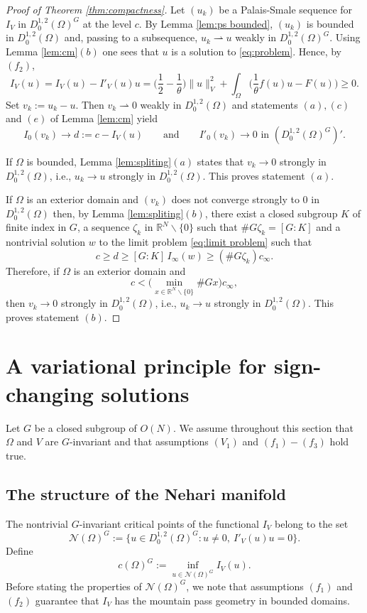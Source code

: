 \documentclass[10pt,letterpaper]{article}
\numberwithin{equation}{section}
\def\rn{\mathbb{R}^N}
\def\rh{\rightharpoonup}
\def\io{\int_{\Omega}}
\def\o{\Omega}
\def\cN{\mathcal{N}}
\begin{document}
\medskip

\begin{proof}[Proof of Theorem \ref{thm:compactness}]
Let $(u_k)$ be a Palais-Smale sequence for $I_V$ in $D^{1,2}_0(\o)^G$ at the level $c$. By Lemma \ref{lem:ps bounded}, $(u_k)$ is bounded in $D^{1,2}_0(\o)$ and, passing to a subsequence, $u_k\rh u$ weakly in $D^{1,2}_0(\o)^G$. Using Lemma \ref{lem:cm}$(b)$ one sees that $u$ is a solution to \eqref{eq:problem}. Hence, by $(f_2)$,
$$I_V(u)=I_V(u)-I'_V(u)u=\Big(\frac{1}{2}-\frac{1}{\theta}\Big)\|u\|^2_V+\io\Big(\frac{1}{\theta}f(u)u-F(u)\Big)\geq 0.$$
Set $v_k:=u_k-u$. Then $v_k\rh 0$ weakly in $D^{1,2}_0(\o)$ and statements $(a),(c)$ and $(e)$ of Lemma \ref{lem:cm} yield
$$I_0(v_k)\to d:=c-I_V(u)\qquad\text{and}\qquad I'_0(v_k)\to 0\text{ \ in \ }(D^{1,2}_0(\o)^G)'.$$

If $\o$ is bounded, Lemma \ref{lem:spliting}$(a)$ states that $v_k\to 0$ strongly in $D^{1,2}_0(\o)$, i.e., $u_k\to u$ strongly in $D^{1,2}_0(\o)$. This proves statement $(a)$.

If $\o$ is an exterior domain and $(v_k)$ does not converge strongly to $0$ in $D^{1,2}_0(\o)$ then, by Lemma \ref{lem:spliting}$(b)$, there exist a closed subgroup $K$ of finite index in $G$, a sequence $\zeta_k$ in $\rn\smallsetminus\{0\}$ such that $\#G\zeta_k=[G:K]$ and a nontrivial solution $w$ to the limit problem \eqref{eq:limit problem} such that
$$c\geq d\geq[G:K]\,I_{\infty}(w)\geq(\#G\zeta_k)c_\infty.$$
Therefore, if $\o$ is an exterior domain and
$$c<\big(\min_{x\in\rn\smallsetminus\{0\}}\#Gx\big)c_\infty,$$
then $v_k\to 0$ strongly in $D^{1,2}_0(\o)$, i.e., $u_k\to u$ strongly in $D^{1,2}_0(\o)$. This proves statement $(b)$.
\end{proof}


\section{A variational principle for sign-changing solutions}

Let $G$ be a closed subgroup of $O(N)$. We assume throughout this section that $\o$ and $V$ are $G$-invariant and that assumptions $(V_1)$ and $(f_1)-(f_3)$ hold true.

\subsection{The structure of the Nehari manifold}

The nontrivial $G$-invariant critical points of the functional $I_V$ belong to the set
$$\cN(\o)^G:= \{u\in D^{1,2}_0(\o)^G : u\neq 0, \ I'_V(u)u=0\}.$$
Define
$$c(\o)^G:= \inf_{u\in\cN(\o)^G} I_V(u).$$ 
Before stating the properties of $\cN(\o)^G$, we note that assumptions $(f_1)$ and $(f_2)$ guarantee that $I_V$ has the mountain pass geometry in bounded domains.
\end{document}
